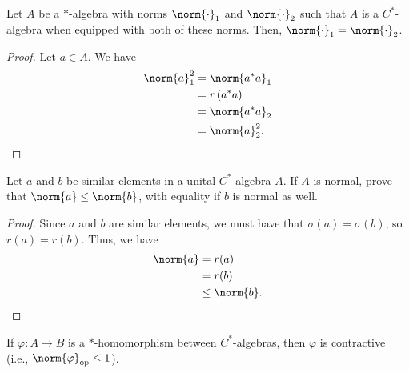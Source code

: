 \documentclass[10pt]{mypackage}
\DeclareMathOperator{\op}{op}
\begin{document}
\begin{proposition}
  Let $A$ be a $\ast$-algebra with norms $\norm{\cdot}_1$ and $\norm{\cdot}_2$ such that $A$ is a $C^{\ast}$-algebra when equipped with both of these norms. Then, $\norm{\cdot}_1 = \norm{\cdot}_2$.
\end{proposition}
\begin{proof}
  Let $a\in A$. We have
  \begin{align*}
    \norm{a}_1^2 &= \norm{a^{\ast}a}_{1}\\
                 &= r\left(a^{\ast}a\right)\\
                 &= \norm{a^{\ast}a}_2\\
                 &= \norm{a}_2^2.
  \end{align*}
\end{proof}
\begin{exercise}
  Let $a$ and $b$ be similar elements in a unital $C^{\ast}$-algebra $A$. If $A$ is normal, prove that $\norm{a}\leq \norm{b}$, with equality if $b$ is normal as well.
\end{exercise}
\begin{proof}
  Since $a$ and $b$ are similar elements, we must have that $\sigma\left(a\right) = \sigma\left(b\right)$, so $r(a) = r(b)$. Thus, we have
  \begin{align*}
    \norm{a} &= r(a)\\
             &= r(b)\\
             &\leq \norm{b}.
  \end{align*}
\end{proof}
\begin{proposition}
  If $\varphi\colon A\rightarrow B$ is a $\ast$-homomorphism between $C^{\ast}$-algebras, then $\varphi$ is contractive (i.e., $\norm{\varphi}_{\op} \leq 1$).
\end{proposition}
\end{document}

